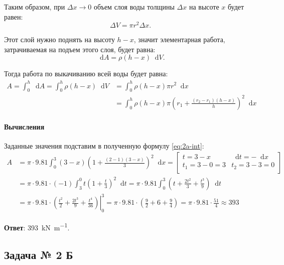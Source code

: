 \documentclass[a4paper,12pt]{article}
\newcommand*\diff{\mathop{}\!\mathrm{d}}
\begin{document}
Таким образом, при \(\Delta x \to 0\) объем слоя воды толщины \(\Delta x\)
на высоте \(x\) будет равен:
\[\Delta V = \pi r^2 \Delta x.\]

Этот слой нужно поднять на высоту \(h - x\),
значит элементарная работа, затрачиваемая на подъем этого слоя,
будет равна:
\[\diff A = \rho (h - x) \diff V.\]

Тогда работа по выкачиванию всей воды будет равна:
\begin{equation}\label{eq:2a-int}
\begin{split}
  A = \int_{0}^{h} \diff A
    = \int_{0}^{h} \rho (h - x) \diff V
    &= \int_{0}^{h} \rho (h - x) \pi r^2 \diff x \\
    &= \int_{0}^{h} \rho (h - x) \pi
       {\left(r_1 + \frac{(r_2 - r_1)(h - x)}{h}\right)}^2 \diff x
\end{split}
\end{equation}

\paragraph{Вычисления}

Заданные значения подставим в полученную формулу \ref{eq:2a-int}:
\begin{equation*}
\begin{split}
  A &= \pi \cdot 9.81 \int_{0}^{3} (3 - x)
      {\left(1 + \frac{(2 - 1)(3 - x)}{3} \right)}^2 \diff x
    =
      \begin{bmatrix}
        t = 3 - x        & \diff t = - \diff x \\
        t_1 = 3 - 0  = 3 & t_2 = 3 - 3 = 0 \\
      \end{bmatrix} \\
    &= \pi \cdot 9.81 \cdot (-1)
       \int_{3}^{0} t {\left(1 + \frac{t}{3}\right)}^2 \diff t
     = \pi \cdot 9.81
       \int_{0}^{3}
         \left(t + \frac{2 t^2}{3} + \frac{t^3}{9} \right) \diff t \\
    &= \pi \cdot 9.81 \cdot
       \left.
         \left(\frac{t^2}{2} + \frac{2 t^3}{9} + \frac{t^4}{36} \right)
       \right\rvert_{0}^{3}
     = \pi \cdot 9.81 \cdot
     \left(\frac{9}{2} + 6 + \frac{9}{4} \right)
     = \pi \cdot 9.81 \cdot \frac{51}{4}
     \approx 393
\end{split}
\end{equation*}

\textbf{Ответ}: \SI{393}{\kilo\newton\per\metre}.

\subsection{Задача № 2 Б}
\end{document}
